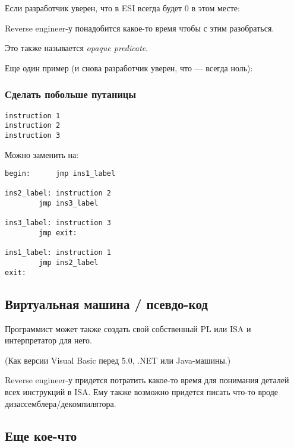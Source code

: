 Если разработчик уверен, что в ESI всегда будет 0 в этом месте:



Reverse engineer-у понадобится какое-то время чтобы с этим разобраться.

Это также называется \emph{opaque predicate}.

Еще один пример (и снова разработчик уверен, что  --- всегда ноль):



\subsubsection{Сделать побольше путаницы}

\begin{lstlisting}
instruction 1
instruction 2
instruction 3
\end{lstlisting}

Можно заменить на:

\begin{lstlisting}[style=customasmx86]
begin:		jmp	ins1_label

ins2_label:	instruction 2
		jmp	ins3_label

ins3_label:	instruction 3
		jmp	exit:

ins1_label:	instruction 1
		jmp	ins2_label
exit:
\end{lstlisting}



\subsection{Виртуальная машина / псевдо-код}

Программист может также создать свой собственный \ac{PL} или \ac{ISA} и интерпретатор для него.

(Как версии Visual Basic перед 5.0, .NET или Java-машины.)

Reverse engineer-у придется потратить какое-то время для понимания деталей всех инструкций в \ac{ISA}.
Ему также возможно придется писать что-то вроде дизассемблера/декомпилятора.

\subsection{Еще кое-что}

